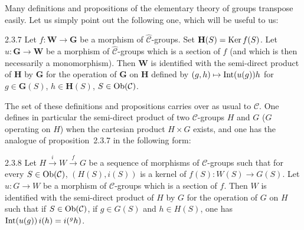 Many definitions and propositions of the elementary theory of groups
transpose easily. Let us simply point out the following one, which will be
useful to us:

\begin{proposition}{2.3.7}\label{I.2.3.7}
Let \(f\colon\mathbf{W}\to\mathbf{G}\) be a morphism of
\(\widehat{\mathcal{C}}\)-groups. Set \(\mathbf{H}(S)=\operatorname{Ker} f(S)\). Let
\(u\colon\mathbf{G}\to\mathbf{W}\) be a morphism of
\(\widehat{\mathcal{C}}\)-groups which is a section of \(f\) (and which is
then necessarily a monomorphism). Then \(\mathbf{W}\) is identified with the
semi-direct product of \(\mathbf{H}\) by \(\mathbf{G}\) for the operation of
\(\mathbf{G}\) on \(\mathbf{H}\) defined by
\((g,h)\mapsto\operatorname{Int}(u(g))h\) for \(g\in\mathbf{G}(S)\),
\(h\in\mathbf{H}(S)\), \(S\in\operatorname{Ob}(\mathcal{C})\).
\end{proposition}

The set of these definitions and propositions carries over as usual to
\(\mathcal{C}\). One defines in particular the semi-direct product of two
\(\mathcal{C}\)-groups \(H\) and \(G\) (\(G\)
operating on \(H\)) when the cartesian product
\(H\times G\) exists, and one has the analogue of
proposition~2.3.7 in the following form:

\begin{proposition}{2.3.8}\label{I.2.3.8}
Let \(H\xrightarrow{i}W\xrightarrow{f}G\) be a
sequence of morphisms of \(\mathcal{C}\)-groups such that for every
\(S\in\operatorname{Ob}(\mathcal{C})\), \((H(S),i(S))\) is a kernel of
\(f(S)\colon W(S)\to G(S)\). Let
\(u\colon G\to W\) be a morphism of \(\mathcal{C}\)-groups
which is a section of \(f\). Then \(W\) is identified with the
semi-direct product of \(H\) by \(G\) for the operation of
\(G\) on \(H\) such that if \(S\in\operatorname{Ob}(\mathcal{C})\), if
\(g\in G(S)\) and \(h\in H(S)\), one has
\(\operatorname{Int}(u(g))\,i(h)=i({}^{g}h)\).
\end{proposition}
